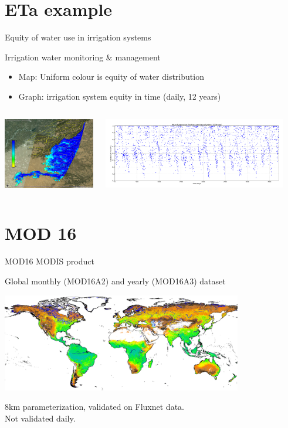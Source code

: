 \documentclass[xcolor=dvipsnames,beamer]{beamer} %
\begin{document}
\section{ETa example}
\begin{frame}[fragile]{Equity of water use in irrigation systems}

Irrigation water monitoring \& management
\begin{itemize}
 \item Map: Uniform colour is equity of water distribution
 \item Graph: irrigation system equity in time (daily, 12 years)
\end{itemize}

\begin{columns}[l]
\begin{center}
\includegraphics[width=4cm]{fess2012ef}
\end{center}

\begin{flushright}
  \includegraphics[width=8cm]{fess2012meaneftemporal}
\end{flushright}
\end{columns}

\end{frame}


\section{MOD 16}
\begin{frame}[fragile]{MOD16 MODIS product}

Global monthly (MOD16A2) and yearly (MOD16A3) dataset
\begin{center}
 \includegraphics[width=10.5cm]{MOD16_2000.png}
\end{center}
8km parameterization, validated on Fluxnet data.\\
Not validated daily.
\end{frame}
\end{document}
